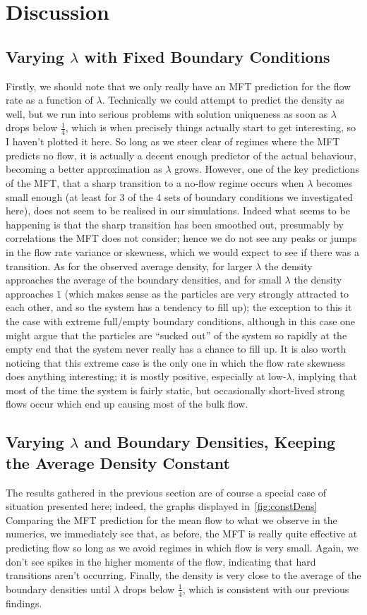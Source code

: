\section{Discussion} \label{sec:conc}
\subsection{Varying $\lambda$ with Fixed Boundary Conditions} 
Firstly, we should note that we only really have an MFT prediction for the flow rate as a function of $\lambda$. Technically we could attempt to predict the density as well, but we run into serious problems with solution uniqueness as soon
as $\lambda$ drops below $\frac{1}{4}$, which is when precisely things actually start to get interesting, so I haven't plotted it here. So long as we steer clear of regimes where the MFT predicts no flow, it is actually a decent enough predictor
of the actual behaviour, becoming a better approximation as $\lambda$ grows. However, one of the key predictions of the MFT, that a sharp transition to a no-flow regime occurs when $\lambda$ becomes small enough (at least for 3 of the 4 sets of
boundary conditions we investigated here), does not seem to be realised in our simulations. Indeed what seems to be happening is that the sharp transition has been smoothed out, presumably by correlations the MFT does not consider; hence we
do not see any peaks or jumps in the flow rate variance or skewness, which we would expect to see if there was a transition. As for the observed average density, for larger $\lambda$ the density approaches the average of the boundary densities,
and for small $\lambda$ the density approaches $1$ (which makes sense as the particles are very strongly attracted to each other, and so the system has a tendency to fill up); the exception to this it the case with extreme full/empty boundary
conditions, although in this case one might argue that the particles are ``sucked out'' of the system so rapidly at the empty end that the system never really has a chance to fill up. It is also worth noticing that this extreme case is the only
one in which the flow rate skewness does anything interesting; it is mostly positive, especially at low-$\lambda$, implying that most of the time the system is fairly static, but occasionally short-lived strong flows occur which end up causing
most of the bulk flow.
\subsection{Varying $\lambda$ and Boundary Densities, Keeping the Average Density Constant}
The results gathered in the previous section are of course a special case of situation presented here; indeed, the graphs displayed in~\ref{fig:constDens} 
Comparing the MFT prediction for the mean flow to what we observe in the numerics, we immediately see that, as before, the MFT is really quite effective at predicting flow so long as we avoid regimes in which flow is very small. Again,
we don't see spikes in the higher moments of the flow, indicating that hard transitions aren't occurring. Finally, the density is very close to the average of the boundary densities  until $\lambda$ drops below $\frac{1}{4}$, which is consistent
with our previous findings.
